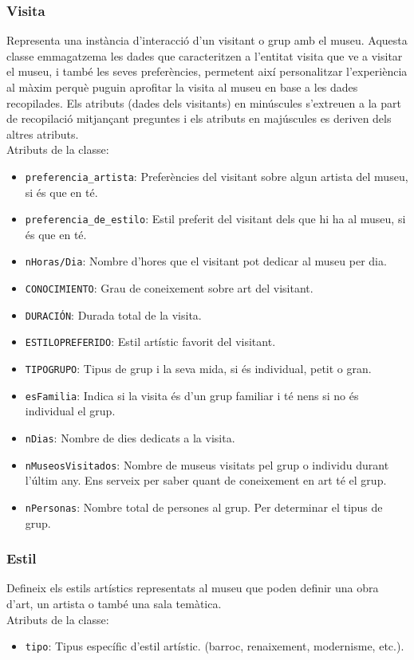 \documentclass[a4paper]{article}
\begin{document}
	\subsubsection*{Visita}
	Representa una instància d'interacció d'un visitant o grup amb el museu. Aquesta classe emmagatzema les dades que caracteritzen a l'entitat visita que ve a visitar el museu, i també les seves preferències, permetent així personalitzar l'experiència al màxim perquè puguin aprofitar la visita al museu en base a les dades recopilades. Els atributs (dades dels visitants) en minúscules s'extreuen a la part de recopilació mitjançant preguntes i els atributs en majúscules es deriven dels altres atributs.\\
	Atributs de la classe:
	\begin{itemize}
		\item \texttt{preferencia\_artista}: Preferències del visitant sobre algun artista del museu, si és que en té.
	 	\item \texttt{preferencia\_de\_estilo}: Estil preferit del visitant dels que hi ha al museu, si és que en té.
		\item \texttt{nHoras/Dia}: Nombre d’hores que el visitant pot dedicar al museu per dia.
		\item \texttt{CONOCIMIENTO}: Grau de coneixement sobre art del visitant.
		\item \texttt{DURACIÓN}: Durada total de la visita.
		\item \texttt{ESTILOPREFERIDO}: Estil artístic favorit del visitant.
		\item \texttt{TIPOGRUPO}: Tipus de grup i la seva mida, si és individual, petit o gran.
		\item \texttt{esFamilia}: Indica si la visita és d’un grup familiar i té nens si no és individual el grup.
		\item \texttt{nDias}: Nombre de dies dedicats a la visita.
		\item \texttt{nMuseosVisitados}: Nombre de museus visitats pel grup o individu durant l'últim any. Ens serveix per saber quant de coneixement en art té el grup.
	 	\item \texttt{nPersonas}: Nombre total de persones al grup. Per determinar el tipus de grup.
	\end{itemize}

	
	\subsubsection*{Estil}
	Defineix els estils artístics representats al museu que poden definir una obra d'art, un artista o també una sala temàtica.\\
	Atributs de la classe:
	\begin{itemize}
		\item \texttt{tipo}: Tipus específic d’estil artístic. (barroc, renaixement, modernisme, etc.).
	\end{itemize}
	
\end{document}
